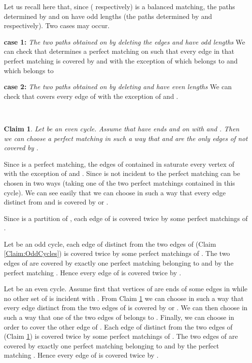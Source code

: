 \documentclass{amsart}
\newtheorem{Clm}{Claim}[thm]
\theoremstyle{definition}
\theoremstyle{remark}
\newenvironment{prf}{{\bf \noindent Proof } }{\hfill\\}
\newenvironment{PrfClaim}{{\bf Proof }}{{\hfill\tiny{\\}}}
\begin{document}
\begin{prf}
\begin{PrfClaim}
Let us recall here that, since   ( respectively) is a balanced
matching, the paths determined by  and  on 
have odd lengths (the paths determined by  and 
respectively). Two cases may occur.

{\bf case 1:} {\it The two paths obtained on  by deleting
the edges  and   have odd lengths} We can
check that  determines a perfect matching on
 such that every edge in that perfect matching is covered by
 and  with the exception of  which belongs
to  and  which belongs to 



{\bf case 2:} {\it The two paths obtained on  by deleting
 and   have even lengths} We can check that
 covers every edge of  with the exception
of  and .

\end{PrfClaim}


\begin{Clm}\label{Claim:EvenCyclesThird}
Let  be an even cycle. Assume that  have
ends  and  on  with  and .  Then we can choose a perfect
matching  in such a way that  and 
are the only edges of  not covered by .
\end{Clm}
\begin{PrfClaim}
Since  is a perfect matching, the edges of   contained
in  saturate every vertex of  with the exception of
 and . Since   is not incident to
 the perfect matching  can be chosen in two ways
(taking one of the two perfect matchings contained in this cycle).
We can see easily that we can choose  in such a way that
every edge distinct from  and  is covered by
 or .
\end{PrfClaim}

Since  is a partition of , each edge of 
is covered twice by some perfect matchings of .

Let  be an odd cycle, each edge of 
distinct from the two edges of  (Claim \ref{Claim:OddCycles}) is
covered twice by some perfect matchings of . The two
edges of   are covered by exactly one perfect matching belonging
to  and by the perfect matching .
Hence every edge of  is covered twice by .

Let  be an even cycle. Assume first that 
vertices of  are ends of some edges in  while no other
set of  is incident with . From Claim
\ref{Claim:EvenCyclesThird} we can choose  in such a way that
 every edge distinct from the two edges of   is
covered by   or . We can then choose  in such a
way that one of the two edges of  belongs to . Finally, we
can choose  in order to cover the other edge of . Each
edge of  distinct from the two edges of  (Claim
 \ref{Claim:EvenCyclesThird}) is
covered twice by some perfect matchings of . The two
edges of   are covered by exactly one perfect matching belonging
to  and by the perfect matching .
Hence every edge of  is covered twice by .



\end{prf}
\end{document}
